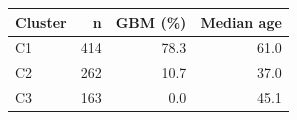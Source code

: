 \begin{tabular}{lrrr}
\toprule
\textbf{Cluster} & \textbf{n} & \textbf{GBM (\%)} & \textbf{Median age} \\
\midrule
C1 & 414 & 78.3 & 61.0 \\
C2 & 262 & 10.7 & 37.0 \\
C3 & 163 & 0.0 & 45.1 \\
\bottomrule
\end{tabular}
